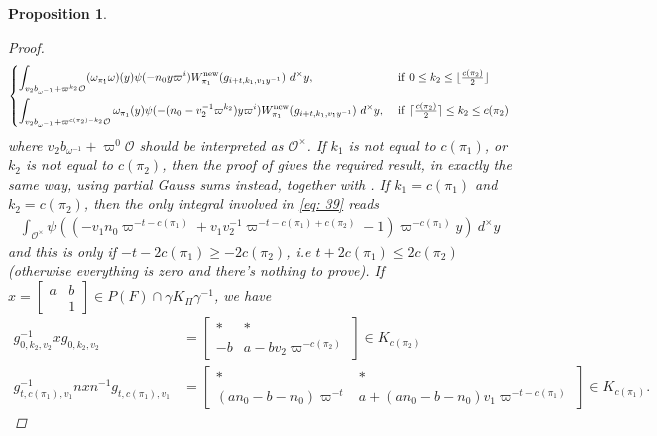 \documentclass{amsart}
\theoremstyle{plain}
\newtheorem{prop}[thm]{Proposition}
\theoremstyle{plain}
\theoremstyle{remark}
\begin{document}
\begin{prop}
\begin{proof}
        $$\begin{dcases}
\int_{v_2b_{\omega^{-1}}+\varpi^{k_2}\mathcal{O}}(\omega_{\pi_1}\omega)(y)\psi(-n_0y\varpi^i)W_{\pi_1}^\mathrm{new}(g_{i+t,k_1,v_1y^{-1}})\ d^\times y,\ &\mathrm{if}\ 0\leq k_2\leq\lfloor \tfrac{c(\pi_2)}{2}\rfloor\\
    \int_{v_2b_{\omega^{-1}}+\varpi^{c(\pi_2)-k_2}\mathcal{O}}\omega_{\pi_1}(y)\psi(-(n_0-v_2^{-1}\varpi^{k_2})y\varpi^i)W_{\pi_1}^\mathrm{new}(g_{i+t,k_1,v_1y^{-1}})\ d^\times y,\ &\mathrm{if}\ \lceil\tfrac{c(\pi_2)}{2}\rceil\leq k_2\leq c(\pi_2)
        \end{dcases}$$
        where $v_2b_{\omega^{-1}}+\varpi^0\mathcal{O}$ should be interpreted as $\mathcal{O}^\times$.
        If $k_1$ is not equal to $c(\pi_1)$, or $k_2$ is not equal to $c(\pi_2)$, then the proof of  gives the required result, in exactly the same way, using partial Gauss sums instead, together with . If $k_1=c(\pi_1)$ and $k_2=c(\pi_2)$, then the only integral involved in  \eqref{eq: 39} reads
        \begin{align}\label{eq: 40}\int_{\mathcal{O}^\times}\psi\left((-v_1n_0\varpi^{-t-c(\pi_1)}+v_1v_2^{-1}\varpi^{-t-c(\pi_1)+c(\pi_2)}-1)\varpi^{-c(\pi_1)}y\right)\ d^\times y\end{align}
        and this is only if $-t-2c(\pi_1)\geq -2c(\pi_2)$, i.e $t+2c(\pi_1)\leq 2c(\pi_2)$ (otherwise everything is zero and there's nothing to prove). If $x=\left[\begin{smallmatrix}
            a & b\\
            & 1
        \end{smallmatrix}\right]\in P(F)\cap \gamma K_\Pi\gamma^{-1}$, we have 
        \begin{align}\label{eq: 41}
    g_{0,k_2,v_2}^{-1}xg_{0,k_2,v_2}&=\left[\begin{smallmatrix}
                    * & * \\
                    -b & a-bv_2\varpi^{-c(\pi_2)}
                \end{smallmatrix}\right]\in K_{c(\pi_2)}\\
            g_{t,c(\pi_1),v_1}^{-1}nxn^{-1}g_{t,c(\pi_1),v_1}&=\left[\begin{smallmatrix}
                    * & *\\
                    (an_0-b-n_0)\varpi^{-t} & a+(an_0-b-n_0)v_1\varpi^{-t-c(\pi_1)}
                \end{smallmatrix}\right]\in K_{c(\pi_1)}.\label{eq: 42}

\end{align}
\end{proof}
\end{prop}
\end{document}
